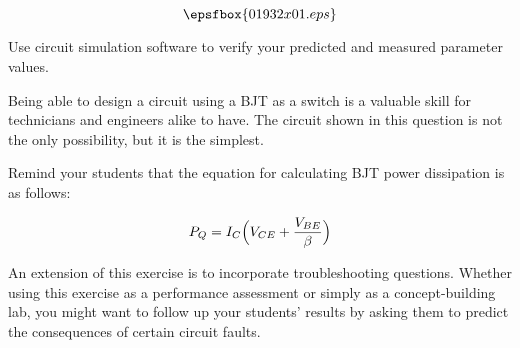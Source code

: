 

$$\epsfbox{01932x01.eps}$$

\vfil \eject






Use circuit simulation software to verify your predicted and measured parameter values.







Being able to design a circuit using a BJT as a switch is a valuable skill for technicians and engineers alike to have.  The circuit shown in this question is not the only possibility, but it is the simplest.

Remind your students that the equation for calculating BJT power dissipation is as follows:

$$P_Q = I_C \Bigl(V_{CE} + {V_{BE} \over \beta}\Bigr)$$

An extension of this exercise is to incorporate troubleshooting questions.  Whether using this exercise as a performance assessment or simply as a concept-building lab, you might want to follow up your students' results by asking them to predict the consequences of certain circuit faults.




